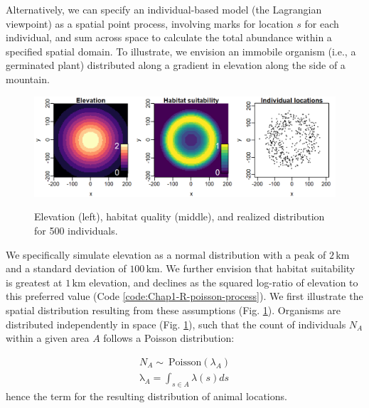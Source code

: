 Alternatively, we can specify an individual-based model (the Lagrangian viewpoint) as a spatial point process, involving marks for location \(s\) for each individual, and sum across space to calculate the total abundance within a specified spatial domain. To illustrate, we envision an immobile organism (i.e., a germinated plant) distributed along a gradient in elevation along the side of a mountain.  

\lstset{style=Rcode}


\begin{figure}[!ht]
    \caption[Individual-based model for habitat utilization]{Elevation (left), habitat quality (middle), and realized distribution for 500 individuals.}
    \centering
    \includegraphics[width=5.5in]{Chap_1/Spatial distribution.png}
    \label{fig:Chap1_distribution}
\end{figure}

We specifically simulate elevation as a normal distribution with a peak of \(2\, \mathrm{km}\) and a standard deviation of \(100\, \mathrm{km}\).  We further envision that habitat suitability is greatest at \(1\, \mathrm{km}\) elevation, and declines as the squared log-ratio of elevation to this preferred value (Code \ref{code:Chap1-R-poisson-process}). We first illustrate the spatial distribution resulting from these assumptions (Fig. \ref{fig:Chap1_distribution}). Organisms are distributed independently in space (Fig. \ref{fig:Chap1_distribution}), such that the count of individuals \(N_A\) within a given area \(A\) follows a Poisson distribution:

\begin{equation}
\begin{gathered}
    N_A \sim\ \mathrm{Poisson}( \lambda_A ) \\
    \mathrm \lambda_A = \int_{s \in A} \lambda(s) ds
\end{gathered}
\end{equation}
hence the term  for the resulting distribution of animal locations.  

